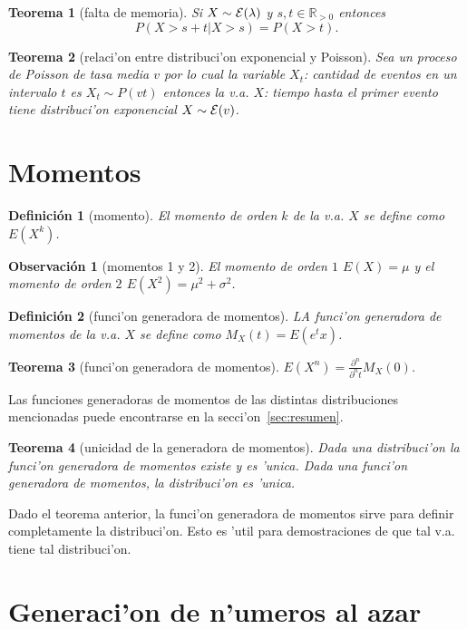 \documentclass[a4paper,spanish]{article}
\newcommand{\R}[0]{\mathbb{R}}
\newcommand{\parcial}[2]{\frac{\partial #1}{\partial #2}}
\newcommand{\expon}[0]{{\cal E}}
\newtheorem{teo}{Teorema}
\newtheorem{defi}{Definici\'on}
\newtheorem{obs}{Observaci\'on}
\begin{document}
\begin{teo}[falta de memoria]
Si $X \sim \expon(\lambda)$ y $s,t \in \R_{>0}$ entonces
$$P(X > s+t | X > s) = P(X > t).$$
\end{teo}

\begin{teo}[relaci'on entre distribuci'on exponencial y Poisson]
Sea un proceso de Poisson de tasa media $v$ por lo cual la variable $X_t$:
cantidad de eventos en un intervalo $t$ es $X_t \sim P(v t)$ entonces
la v.a. $X$: tiempo hasta el primer evento tiene distribuci'on exponencial
$X \sim \expon(v)$.
\end{teo}

\section{Momentos}

\begin{defi}[momento]
El \emph{momento de orden $k$} de la v.a. $X$ se define como $E(X^k)$.
\end{defi}

\begin{obs}[momentos 1 y 2]
El momento de orden $1$ $E(X) = \mu$ y el momento de orden $2$ 
$E(X^2) = \mu^2 + \sigma^2$.
\end{obs}

\begin{defi}[funci'on generadora de momentos]
LA \emph{funci'on generadora de momentos} de la v.a. $X$ se define como
$M_X(t) = E(e^tx)$.
\end{defi}

\begin{teo}[funci'on generadora de momentos]
$E(X^n) = \parcial{^n}{^n t} M_X(0)$.
\end{teo}

Las funciones generadoras de momentos de las distintas distribuciones
mencionadas puede encontrarse en la secci'on~\ref{sec:resumen}.

\begin{teo}[unicidad de la generadora de momentos]
Dada una distribuci'on la funci'on generadora de momentos existe y es 'unica.
Dada una funci'on generadora de momentos, la distribuci'on es 'unica.
\end{teo}
Dado el teorema anterior, la funci'on generadora de momentos sirve para 
definir completamente la distribuci'on. Esto es 'util para demostraciones
de que tal v.a. tiene tal distribuci'on.

\section{Generaci'on de n'umeros al azar}
\end{document}
